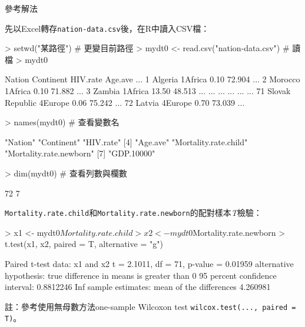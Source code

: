 \documentclass[14pt, aspectratio=43]{beamer}
\begin{document}
\begin{frame}{參考解法}

先以Excel轉存\texttt{nation-data.csv}後，在R中讀入CSV檔：
\begin{RC}
> setwd("某路徑") # 更變目前路徑
> mydt0 <- read.csv("nation-data.csv")  # 讀檔
> mydt0
\end{RC}
\begin{R}
            Nation Continent HIV.rate Age.ave ...
1          Algeria   1Africa     0.10  72.904 ...
2          Morocco   1Africa     0.10  71.882 ...
3           Zambia   1Africa    13.50  48.513 ...
               ...       ...      ...     ... ...
71 Slovak Republic   4Europe     0.06  75.242 ...
72          Latvia   4Europe     0.70  73.039 ...
\end{R}

\framebreak 

\begin{RC}
> names(mydt0)  # 查看變數名
\end{RC}
\begin{R}
[1] "Nation"     "Continent"              "HIV.rate"              
[4] "Age.ave"    "Mortality.rate.child"   "Mortality.rate.newborn"
[7] "GDP.10000" 
\end{R}
\begin{RC}
> dim(mydt0)   # 查看列數與欄數
\end{RC}
\begin{R}
[1] 72  7
\end{R}

\framebreak 

\texttt{Mortality.rate.child}和\texttt{Mortality.rate.newborn}的配對樣本\emph{T}檢驗：
\begin{RC}
> x1 <- mydt0$Mortality.rate.child
> x2 <- mydt0$Mortality.rate.newborn
> t.test(x1, x2, paired = T, alternative = "g")
\end{RC}

\begin{R}
        Paired t-test
data:  x1 and x2
t = 2.1011, df = 71, p-value = 0.01959
alternative hypothesis: true difference in means is greater than 0
95 percent confidence interval:
 0.8812246       Inf
sample estimates:
mean of the differences 
               4.260981
\end{R}

\begin{flushleft}
\footnotesize 註：參考使用無母數方法one-sample Wilcoxon test \verb+wilcox.test(..., paired = T)+。
\end{flushleft}


\end{frame}
\end{document}
